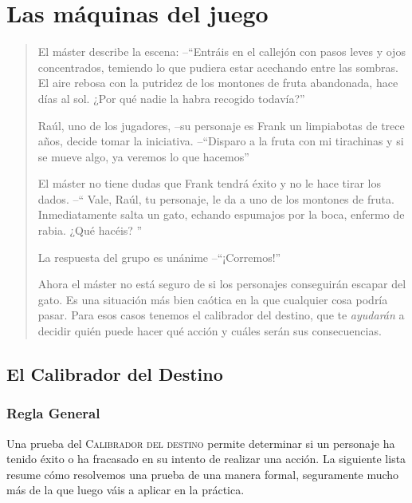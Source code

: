 \chapter{Las máquinas del juego}
\varhrulefill
\begin{quotation}

El máster describe la escena: --\enquote{Entráis en el callejón con pasos
 leves y ojos concentrados, temiendo lo que pudiera estar acechando entre 
 las sombras. El aire rebosa con la putridez de los montones de fruta abandonada, 
 hace días al sol. ¿Por qué nadie la habra recogido todavía?}

Raúl, uno de los jugadores, --su personaje es Frank un limpiabotas de trece años, 
decide tomar la iniciativa. --\enquote{Disparo a la fruta con mi tirachinas 
y si se mueve algo, ya veremos lo que hacemos}

El máster no tiene dudas que Frank tendrá éxito y no le hace tirar los dados. --\enquote{
Vale, Raúl, tu personaje, le da a uno de los montones de fruta. Inmediatamente
salta un gato, echando espumajos por la boca, enfermo de rabia. ¿Qué hacéis?
}

La respuesta del grupo es unánime --\enquote{¡Corremos!} 

Ahora el máster no está seguro de si los personajes conseguirán escapar del gato.
Es una situación más bien caótica en la que cualquier cosa podría pasar. Para esos
casos tenemos el calibrador del destino, que te \emph{ayudarán} a decidir quién puede 
hacer qué acción y cuáles serán sus consecuencias.

\end{quotation}

\section{El Calibrador del Destino}

\subsection{Regla General}

Una prueba del \textsc{Calibrador del destino} permite determinar si un personaje ha tenido éxito o ha fracasado en su intento de realizar una acción. La siguiente lista resume cómo resolvemos una prueba de una manera formal, seguramente mucho más de la que luego váis a aplicar en la práctica.

